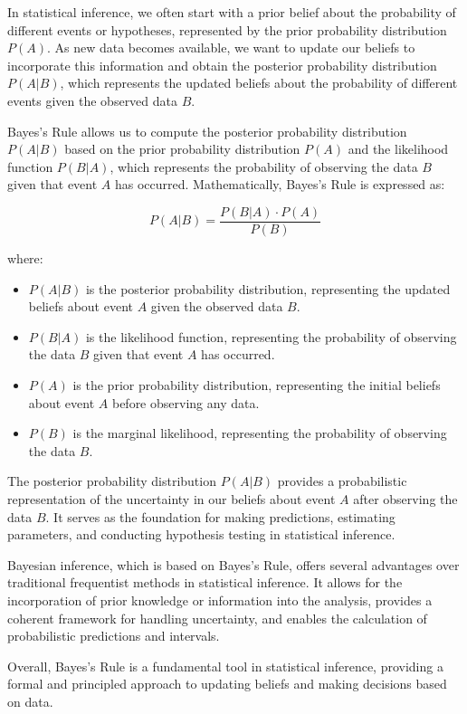 \documentclass[12pt]{book} %
\begin{document}
In statistical inference, we often start with a prior belief about the probability of different events or hypotheses, represented by the prior probability distribution \(P(A)\). As new data becomes available, we want to update our beliefs to incorporate this information and obtain the posterior probability distribution \(P(A|B)\), which represents the updated beliefs about the probability of different events given the observed data \(B\).

Bayes's Rule allows us to compute the posterior probability distribution \(P(A|B)\) based on the prior probability distribution \(P(A)\) and the likelihood function \(P(B|A)\), which represents the probability of observing the data \(B\) given that event \(A\) has occurred. Mathematically, Bayes's Rule is expressed as:

\[
P(A|B) = \frac{P(B|A) \cdot P(A)}{P(B)}
\]

where:
\begin{itemize}
    \item \(P(A|B)\) is the posterior probability distribution, representing the updated beliefs about event \(A\) given the observed data \(B\).
    \item \(P(B|A)\) is the likelihood function, representing the probability of observing the data \(B\) given that event \(A\) has occurred.
    \item \(P(A)\) is the prior probability distribution, representing the initial beliefs about event \(A\) before observing any data.
    \item \(P(B)\) is the marginal likelihood, representing the probability of observing the data \(B\).
\end{itemize}

The posterior probability distribution \(P(A|B)\) provides a probabilistic representation of the uncertainty in our beliefs about event \(A\) after observing the data \(B\). It serves as the foundation for making predictions, estimating parameters, and conducting hypothesis testing in statistical inference.

Bayesian inference, which is based on Bayes's Rule, offers several advantages over traditional frequentist methods in statistical inference. It allows for the incorporation of prior knowledge or information into the analysis, provides a coherent framework for handling uncertainty, and enables the calculation of probabilistic predictions and intervals.

Overall, Bayes's Rule is a fundamental tool in statistical inference, providing a formal and principled approach to updating beliefs and making decisions based on data.
\end{document}

